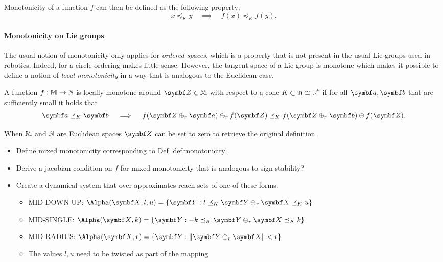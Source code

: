 Monotonicity of a function $f$ can then be defined as the following property:
\begin{equation}
  x \preceq_K y  \quad \implies \quad f(x) \preceq_K f(y).
\end{equation}

\paragraph{Monotonicity on Lie groups}
The usual notion of monotonicity only applies for \emph{ordered spaces}, which is a property that is not present in the usual Lie groups used in robotics. Indeed, for a circle ordering makes little sense.  However, the tangent space of a Lie group is monotone which makes it possible to define a notion of \emph{local monotonicity} in a way that is analogous to the Euclidean case.

\begin{definition}
  \label{def:monotonicity}
  A function $f : {\mathbb{M}} \rightarrow {\mathbb{N}}$ is locally monotone around $\Z \in \M$ with respect to a cone $K \subset \mathfrak m \cong \mathbb{R}^n$ if for all $\a, \b$ that are sufficiently small it holds that
  \begin{equation}
    \a \preceq_K \b \quad \implies \quad f(\Z \oplus_r \a) \ominus_r f(\Z) \preceq_K f(\Z \oplus_r \b) \ominus f(\Z).
  \end{equation}
\end{definition}
When ${\mathbb{M}}$ and ${\mathbb{N}}$ are Euclidean spaces $\Z$ can be set to zero to retrieve the original definition.

\begin{itemize}
  \item Define mixed monotonicity corresponding to Def \eqref{def:monotonicity}.
  \item Derive a jacobian condition on $f$ for mixed monotonicity that is analogous to sign-stability?
  \item Create a dynamical system that over-approximates reach sets of one of these forms:
        \begin{itemize}
          \item MID-DOWN-UP: $\Alpha(\X, l, u) = \{ \Y : l \preceq_K \Y \ominus_r \X \preceq_K u \}$
          \item MID-SINGLE: $\Alpha(\X, k) = \{ \Y : -k \preceq_K \Y \ominus_r \X \preceq_K k \}$
          \item MID-RADIUS: $\Alpha(\X, r) = \{ \Y : \| \Y \ominus_r \X \| < r \}$
          \item The values $l, u$ need to be twisted as part of the mapping
        \end{itemize}
\end{itemize}

